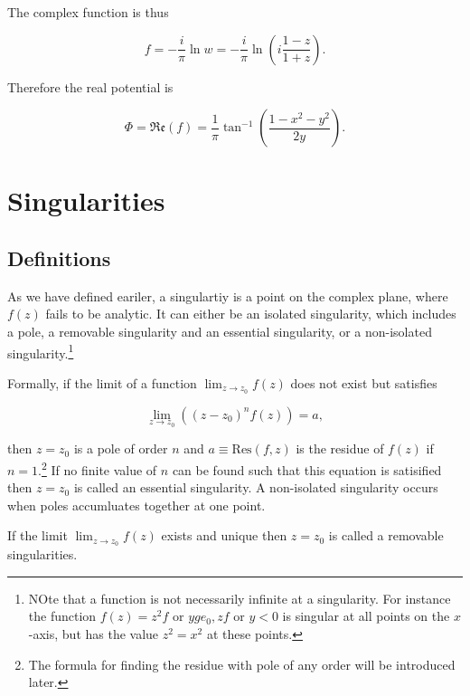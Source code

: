 \documentclass[english,a4paper,12pt]{report}
\begin{document}
The complex function is thus 

\begin{equation}
    f = -\frac{i}{\pi } \ln  w = -\frac{i}{\pi }\ln \left( i \frac{1-z}{1+z}  \right).
\end{equation}

Therefore the real potential is 

\begin{equation}
    \Phi  = \mathfrak{Re} (f) = \frac{1}{\pi } \tan ^{-1} \left( \frac{1-x^2-y^2}{2y}  \right).
\end{equation}



\section{Singularities}

\subsection{Definitions}

As we have defined eariler, a singulartiy is a point on the complex plane, where \(f(z)\) fails to be analytic. It can either be an isolated singularity, which includes a pole, a removable singularity and an essential singularity, or a non-isolated singularity.\footnote{NOte that a function is not necessarily infinite at a singularity. For instance the function \(f(z) = z^2 f\text { or } yge_0 , z f\text { or }  y < 0\) is singular at all points on the \(x\)-axis, but has the value \(z^2=x^2\) at these points.} 

Formally, if the limit of a function \(\lim_{z \to z_0 } f(z)\) does not exist but satisfies

\begin{equation}
    \lim_{z \to z_0 } ((z-z_0 )^{n}f(z) ) = a, \label{lim} 
\end{equation}

then \(z = z_0 \)  is a pole of order \(n\) and \(a \equiv \text{Res}(f,z) \) is the residue of \(f(z)\) if \(n =1\).\footnote{The formula for finding the residue with pole of any order will be introduced later.} If no finite value of \(n\) can be found such that this equation is satisified then \(z = z_0 \) is called an essential singularity. A non-isolated singularity occurs when poles accumluates together at one point.

If the limit \(\lim_{z \to z_0 } f(z)\) exists and unique then \(z = z_0 \) is called a removable singularities.  
\end{document}
